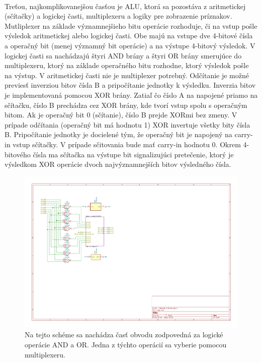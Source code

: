 \documentclass{article}
\begin{document}
    \paragraph{}
    Treťou, najkomplikovanejšou časťou je ALU, ktorá sa pozostáva z aritmetickej (sčítačky) a logickej časti, multiplexeru a logiky pre zobrazenie príznakov. Mutliplexer na základe významnejšieho bitu operácie rozhoduje, či na vstup pošle výsledok aritmetickej alebo logickej časti. Obe majú na vstupe dve 4-bitové čísla a operačný bit (menej významný bit operácie) a na výstupe 4-bitový výsledok. V logickej časti sa nachádzajú štyri AND brány a štyri OR brány smerujúce do multiplexeru, ktorý na základe operačného bitu rozhodne, ktorý výsledok pošle na výstup. V aritmetickej časti nie je multiplexer potrebný. Odčítanie je možné previesť inverziou bitov čísla B a pripočítanie jednotky k výsledku. Inverzia bitov je implementovaná pomocou XOR brány. Zatiaľ čo číslo A na napojené priamo na sčítačku, číslo B prechádza cez XOR brány, kde tvorí vstup spolu s operačným bitom. Ak je operačný bit 0 (sčítanie), číslo B prejde XORmi bez zmeny. V prípade odčítania (operačný bit má hodnotu 1) XOR invertuje všetky bity čísla B. Pripočítanie jednotky je docielené tým, že operačný bit je napojený na carry-in vstup sčítačky. V prípade sčitovania bude mať carry-in hodnotu 0. Okrem 4-bitového čísla ma sčítačka na výstupe bit signalizujúci pretečenie, ktorý je výsledkom XOR operácie dvoch najvýznamnejších bitov výsledného čísla.

    \begin{figure}[h!]
        \centering
        \includegraphics[width=.9\linewidth]{logic_sheet.pdf}
        \caption{Na tejto schéme sa nachádza časť obvodu zodpovedná za logické operácie AND a OR. Jedna z týchto operácií sa vyberie pomocou multiplexeru.}
    \end{figure}
\end{document}
